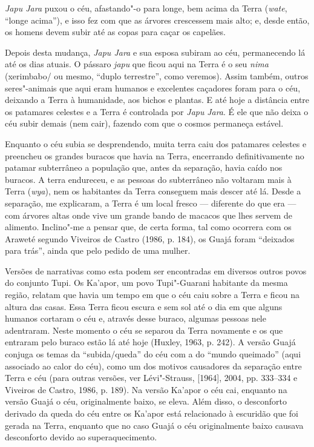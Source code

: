 \emph{Japu Jara} puxou o céu, afastando"-o para longe, bem acima da Terra
(\emph{wate}, ``longe acima''), e isso fez com que as árvores crescessem
mais alto; e, desde então, os homens devem subir até as copas para caçar
os capelães.

Depois desta mudança, \emph{Japu Jara} e sua esposa subiram ao céu,
permanecendo lá até os dias atuais. O pássaro \emph{japu} que ficou aqui
na Terra é o seu \emph{nima} (xerimbabo/ ou mesmo, ``duplo terrestre'',
como veremos). Assim também, outros seres"-animais que aqui eram humanos
e excelentes caçadores foram para o céu, deixando a Terra à humanidade,
aos bichos e plantas. E até hoje a distância entre os patamares celestes
e a Terra é controlada por \emph{Japu} \emph{Jara}. É ele que não deixa
o céu subir demais (nem cair), fazendo com que o cosmos permaneça
estável.

Enquanto o céu subia se desprendendo, muita terra caiu dos patamares
celestes e preencheu os grandes buracos que havia na Terra, encerrando
definitivamente no patamar subterrâneo a população que, antes da
separação, havia caído nos buracos. A terra endureceu, e as pessoas do
subterrâneo não voltaram mais à Terra (\emph{wya}), nem os habitantes da
Terra conseguem mais descer até lá. Desde a separação, me explicaram, a
Terra é um local fresco --- diferente do que era --- com árvores altas onde
vive um grande bando de macacos que lhes servem de alimento. Inclino"-me
a pensar que, de certa forma, tal como ocorrera com os Araweté segundo
Viveiros de Castro (1986, p. 184), os Guajá foram ``deixados para
trás'', ainda que pelo pedido de uma mulher.

Versões de narrativas como esta podem ser encontradas em diversos outros
povos do conjunto Tupi. Os Ka'apor, um povo Tupi"-Guarani habitante da
mesma região, relatam que havia um tempo em que o céu caiu sobre a Terra
e ficou na altura das casas. Essa Terra ficou escura e sem sol até o dia
em que alguns humanos cortaram o céu e, através desse buraco, algumas
pessoas nele adentraram. Neste momento o céu se separou da Terra
novamente e os que entraram pelo buraco estão lá até hoje (Huxley, 1963,
p. 242). A versão Guajá conjuga os temas da ``subida/queda'' do céu com a
do ``mundo queimado'' (aqui associado ao calor do céu), como um dos
motivos causadores da separação entre Terra e céu (para outras versões,
ver Lévi"-Strauss, {[}1964{]}, 2004, pp. 333--334 e Viveiros de Castro,
1986, p. 189). Na versão Ka'apor o céu cai, enquanto na versão Guajá o
céu, originalmente baixo, se eleva. Além disso, o desconforto derivado
da queda do céu entre os Ka'apor está relacionado à escuridão que foi
gerada na Terra, enquanto que no caso Guajá o céu originalmente baixo
causava desconforto devido ao superaquecimento.


